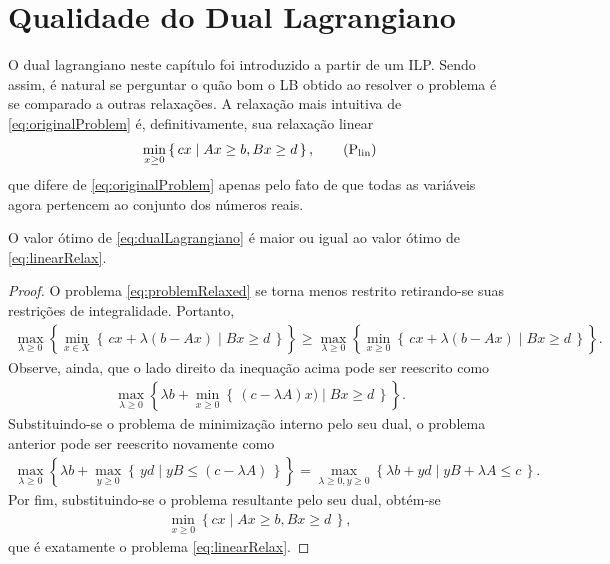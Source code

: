 {\section{Qualidade do Dual Lagrangiano}

O dual lagrangiano neste capítulo foi introduzido a partir de um ILP. Sendo assim, é natural se perguntar o quão bom o LB obtido ao resolver o problema é se comparado a outras relaxações. A relaxação mais intuitiva de \eqref{eq:originalProblem} é, definitivamente, sua relaxação linear
\begin{align*}
	\min_{x \geq 0} \left\{\, cx \mid Ax \geq b, Bx \geq d \,\right\}, \tag{$\text{P}_\text{lin}$}\label{eq:linearRelax}
\end{align*}
que difere de \eqref{eq:originalProblem} apenas pelo fato de que todas as variáveis  agora pertencem ao conjunto dos números reais.
\begin{theorem}
	\label{thm:dualBetterThanLin}
	O valor ótimo de \eqref{eq:dualLagrangiano} é maior ou igual ao valor ótimo de \eqref{eq:linearRelax}. 
\end{theorem}
\begin{proof}
	O problema \eqref{eq:problemRelaxed} se torna menos restrito retirando-se suas restrições de integralidade. Portanto,
	\begin{align*}
		\max_{\lambda \geq 0} \left\{ \min_{x \in X}\left\{\, cx + \lambda(b - Ax) \mid Bx \geq d\,\right\} \right\} \geq \max_{\lambda \geq 0} \left\{ \min_{x \geq 0}\left\{\, cx + \lambda(b - Ax) \mid Bx \geq d\,\right\} \right\}.
	\end{align*}
	Observe, ainda, que o lado direito da inequação acima pode ser reescrito como
	\begin{align*}
		\max_{\lambda \geq 0} \left\{ \lambda b + \min_{x \geq 0}\left\{\, (c - \lambda A) x ) \mid Bx \geq d\,\right\} \right\}.
	\end{align*}
	Substituindo-se o problema de minimização interno pelo seu dual, o problema anterior pode ser reescrito novamente como
	\begin{align*}
		\max_{\lambda \geq 0} \left\{ \lambda b + \max_{y \geq 0}\left\{\, yd  \mid yB \leq (c - \lambda A) \,\right\} \right\} = \max_{\lambda \geq 0, y \geq 0} \left\{ \lambda b + yd  \mid yB + \lambda A\leq c \, \right\}.
	\end{align*}
	Por fim, substituindo-se o problema resultante pelo seu dual, obtém-se
	\begin{align*}
		\min_{x \geq 0} \left\{ cx  \mid Ax \geq b, Bx \geq d \, \right\},
	\end{align*}
	que é exatamente o problema \eqref{eq:linearRelax}.
\end{proof}

}
